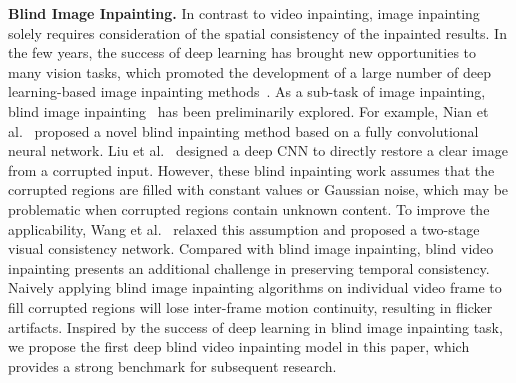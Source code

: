 \noindent\textbf{Blind Image Inpainting.}
In contrast to video inpainting, image inpainting solely requires consideration of the spatial consistency of the inpainted results. In the few years, the success of deep learning has brought new opportunities to many vision tasks, which promoted the development of a large number of deep learning-based image inpainting methods~\cite{shamsolmoali2023transinpaint,dong2022incremental,liu2022reduce,li2022misf,cao2022learning}. 
As a sub-task of image inpainting, blind image inpainting~\cite{wang2020vcnet,zhao2022transcnn,li2024semid,li2023decontamination,10147235} has been preliminarily explored. 
For example,
Nian et al.~\cite{cai2017blind} proposed a novel blind inpainting method based on a fully convolutional neural network. 
Liu et al.~\cite{BII} designed a deep CNN to directly restore a clear image from a corrupted input. However, these blind inpainting work assumes that the corrupted regions are filled with constant values or Gaussian noise, which may be problematic when corrupted regions contain unknown content. To improve the applicability, Wang et al.~\cite{wang2020vcnet} relaxed this assumption and proposed a two-stage visual consistency network. 
Compared with blind image inpainting, blind video inpainting presents an additional challenge in preserving temporal consistency. Naively applying blind image inpainting algorithms on individual video frame to fill corrupted regions will lose inter-frame motion continuity, resulting in flicker artifacts. Inspired by the success of deep learning in blind image inpainting task, we propose the first deep blind video inpainting model in this paper, which provides a strong benchmark for subsequent research.
